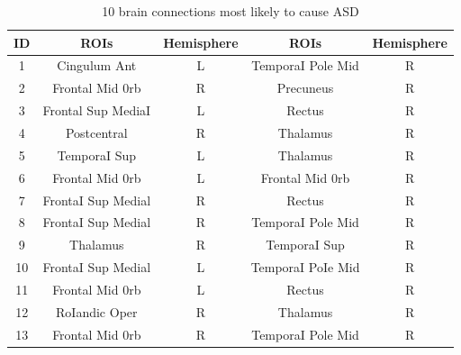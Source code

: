 \documentclass[a4paper]{cas-dc}
\begin{document}
\begin{table}[]
	\tabcolsep=1cm
	\caption{10 brain connections most likely to cause ASD}\label{Table6}
	\begin{tabular*}{\tblwidth}{@{}ccccc@{}}
		\toprule
\textbf{ID} & \textbf{ROIs}      & \textbf{\textbf{Hemisphere}} & \textbf{\textbf{ROIs}} & \textbf{\textbf{\textbf{\textbf{Hemisphere}}}} \\ \midrule
1           & Cingulum Ant       & L                            & TemporaI Pole Mid      & R                                              \\
2           & Frontal Mid 0rb    & R                            & Precuneus              & R                                              \\
3           & Frontal Sup MediaI & L                            & Rectus                 & R                                              \\
4           & Postcentral        & R                            & Thalamus               & R                                              \\
5           & TemporaI Sup       & L                            & Thalamus               & R                                              \\
6           & Frontal Mid 0rb    & L                            & Frontal Mid 0rb        & R                                              \\
7           & FrontaI Sup Medial & R                            & Rectus                 & R                                              \\
8           & FrontaI Sup Medial & R                            & TemporaI Pole Mid      & R                                              \\
9           & Thalamus           & R                            & TemporaI Sup           & R                                              \\
10          & FrontaI Sup Medial & L                            & TemporaI PoIe Mid      & R                                              \\
11          & Frontal Mid 0rb    & L                            & Rectus                 & R                                              \\
12          & RoIandic Oper      & R                            & Thalamus               & R                                              \\
13          & Frontal Mid 0rb    & R                            & TemporaI Pole Mid      & R                                              \\

\end{tabular*}
\end{table}
\end{document}
